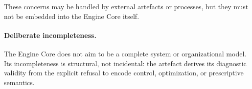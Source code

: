 These concerns may be handled by external artefacts or processes, but they must
not be embedded into the Engine Core itself.

\paragraph{Deliberate incompleteness.}
The Engine Core does not aim to be a complete system or organizational model.
Its incompleteness is structural, not incidental: the artefact derives its
diagnostic validity from the explicit refusal to encode control, optimization,
or prescriptive semantics.
